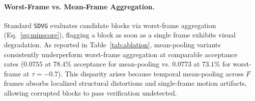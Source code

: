 \documentclass{article} %
\newcommand{\threshold}{\tau}
\begin{document}
\paragraph{Worst-Frame vs. Mean-Frame Aggregation.}
Standard \texttt{SDVG} evaluates candidate blocks via worst-frame aggregation (Eq.~\ref{eq:minscore}), flagging a block as soon as a single frame exhibits visual degradation. As reported in Table~\ref{tab:ablation}, mean-pooling variants consistently underperform worst-frame aggregation at comparable acceptance rates ($0.0755$ at $78.4\%$ acceptance for mean-pooling vs. $0.0773$ at $73.1\%$ for worst-frame at $\threshold = -0.7$). This disparity arises because temporal mean-pooling across $F$ frames absorbs localized structural distortions and single-frame motion artifacts, allowing corrupted blocks to pass verification undetected.

\end{document}
